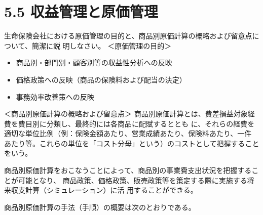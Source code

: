 \documentclass[report,gutter=10mm,fore-edge=10mm,uplatex,dvipdfmx]{jlreq}
\begin{document}
\section{5.5 収益管理と原価管理}
生命保険会社における原価管理の目的と、商品別原価計算の概略および留意点について、簡潔に説
明しなさい。
\answer{}
＜原価管理の目的＞
\begin{itemize}
\item[] 商品別・部門別・顧客別等の収益性分析への反映
\item[] 価格政策への反映（商品の保険料および配当の決定）
\item[] 事務効率改善策への反映
\end{itemize}

＜商品別原価計算の概略および留意点＞
商品別原価計算とは、費差損益対象経費を費目別に分類し、最終的には各商品に配賦するととも
に、それらの経費を適切な単位比例（例：保険金額あたり、営業成績あたり、保険料あたり、一件
あたり等。これらの単位を「コスト分母」という）のコストとして把握することをいう。

商品別原価計算をおこなうことによって、商品別の事業費支出状況を把握することが可能となり、
商品政策、価格政策、販売政策等を策定する際に実施する将来収支計算（シミュレーション）に活
用することができる。

商品別原価計算の手法（手順）の概要は次のとおりである。
\end{document}
